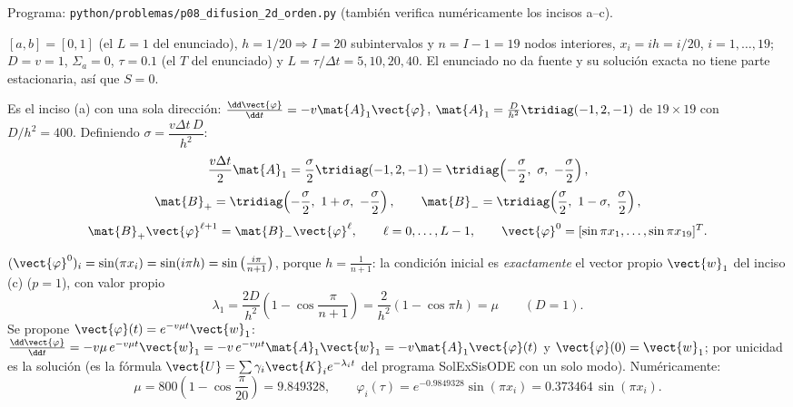 Programa: \texttt{python/problemas/p08\_difusion\_2d\_orden.py} (también verifica numéricamente los
incisos a--c).

$[a, b] = [0, 1]$ (el $L = 1$ del enunciado), $h = 1/20 \Rightarrow I = 20$ subintervalos y
$n = I - 1 = 19$ nodos interiores, $x_i = ih = i/20$, $i = 1, \dots, 19$; $D = v = 1$, $\Sigma_a = 0$,
$\tau = 0.1$ (el $T$ del enunciado) y $L = \tau/\Delta t = 5, 10, 20, 40$. El enunciado no da fuente y su
solución exacta no tiene parte estacionaria, así que $S = 0$.

Es el inciso (a) con una sola dirección: $\frac{\dd\vect{\varphi}}{\dd t} = -v\mat{A}_1\vect{\varphi}$,
$\mat{A}_1 = \frac{D}{h^2}\tridiag(-1, 2, -1)$ de $19\times19$ con $D/h^2 = 400$. Definiendo
$\sigma = \dfrac{v\Delta t\,D}{h^2}$:
\[
  \frac{v\Delta t}{2}\mat{A}_1 = \frac{\sigma}{2}\tridiag(-1, 2, -1) = \tridiag\!\left(-\frac{\sigma}{2},\ \sigma,\ -\frac{\sigma}{2}\right),
\]
\[
  \mat{B}_+ = \tridiag\!\left(-\frac{\sigma}{2},\ 1 + \sigma,\ -\frac{\sigma}{2}\right), \qquad
  \mat{B}_- = \tridiag\!\left(\frac{\sigma}{2},\ 1 - \sigma,\ \frac{\sigma}{2}\right),
\]
\[
  \mat{B}_+\vect{\varphi}^{\ell+1} = \mat{B}_-\vect{\varphi}^\ell, \qquad \ell = 0, \dots, L-1,
  \qquad \vect{\varphi}^0 = [\sin\pi x_1, \dots, \sin\pi x_{19}]^T .
\]

$(\vect{\varphi}^0)_i = \sin(\pi x_i) = \sin(i\pi h) = \sin\big(\tfrac{i\pi}{n+1}\big)$, porque $h = \frac{1}{n+1}$:
la condición inicial es \emph{exactamente} el vector propio $\vect{w}_1$ del inciso (c) ($p = 1$), con valor propio
\[
  \lambda_1 = \frac{2D}{h^2}\left(1 - \cos\frac{\pi}{n+1}\right) = \frac{2}{h^2}\left(1 - \cos\pi h\right) = \mu
  \qquad (D = 1).
\]
Se propone $\vect{\varphi}(t) = e^{-v\mu t}\vect{w}_1$:
$\frac{\dd\vect{\varphi}}{\dd t} = -v\mu\,e^{-v\mu t}\vect{w}_1 = -v\,e^{-v\mu t}\mat{A}_1\vect{w}_1 = -v\mat{A}_1\vect{\varphi}(t)$ y
$\vect{\varphi}(0) = \vect{w}_1$; por unicidad es la solución (es la fórmula
$\vect{U} = \sum\gamma_i\vect{K}_i e^{-\lambda_i t}$ del programa SolExSisODE con un solo modo). Numéricamente:
\[
  \mu = 800\left(1 - \cos\frac{\pi}{20}\right) = 9.849328, \qquad
  \varphi_i(\tau) = e^{-0.9849328}\sin(\pi x_i) = 0.373464\,\sin(\pi x_i).
\]

